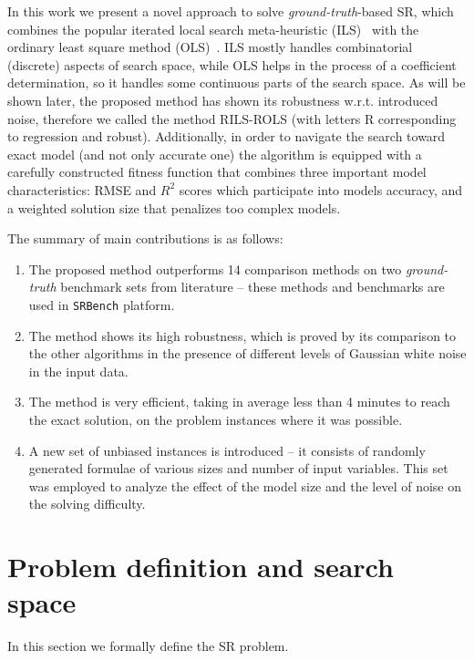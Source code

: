 \documentclass{bmcart}
\begin{document}
In this work we present a novel approach to solve \emph{ground-truth}-based SR, which combines the popular iterated local search meta-heuristic (ILS)~\cite{lourencco2003iterated,lourencco2019iterated} with the ordinary least square method (OLS)~\cite{leng2007ordinary}. ILS mostly handles combinatorial (discrete) aspects of search space, while OLS helps in the process of a coefficient determination, so it handles some continuous parts of the search space. As will be shown later, the proposed method has shown its robustness w.r.t. introduced noise, therefore we called the method \textsc{RILS}-\textsc{ROLS}  (with letters R corresponding to regression and robust). Additionally, in order to navigate the search toward exact model (and not only accurate one) the algorithm is equipped with a carefully constructed fitness function that combines three important model characteristics: RMSE and $R^2$ scores which participate into models accuracy, and a weighted solution size that penalizes too complex models. 

The summary of main contributions is as follows: 

\begin{enumerate}
	\item The proposed method outperforms 14 comparison methods on two \emph{ground-truth} benchmark sets from literature -- these methods and benchmarks are used in \texttt{SRBench} platform.  
	
	\item The method shows its high robustness, which is proved by its comparison to the other algorithms in the presence of different levels of Gaussian white noise in the input data. 
	
	\item The method is very efficient, taking in average less than 4 minutes to reach the exact solution, on the problem instances where it was possible. 
	
	\item A new set of unbiased instances is introduced -- it consists of randomly generated formulae of various sizes and number of input variables. This set was employed to analyze the effect of the model size and the level of noise on the solving difficulty. 
\end{enumerate}
 
	\section{Problem definition and search space}
\label{sec:search-space}
In this section we formally define the SR problem.
\end{document}
